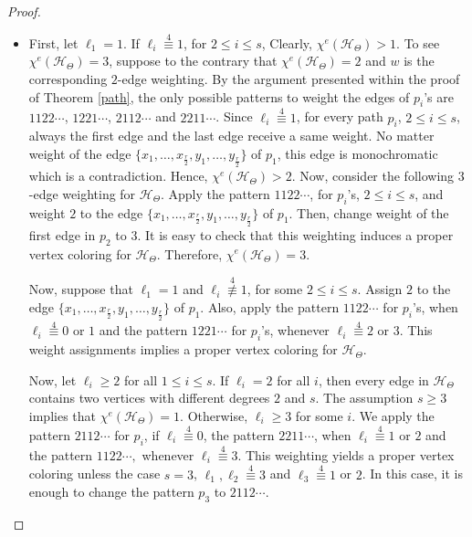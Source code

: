 \documentclass[12pt,a4paper]{article}
\begin{document}
\begin{proof}
\begin{itemize}
		\item[iii.]  First, let $ \ell_1=1 $. If $ \ell_i\overset{4}{\equiv}1 $, for $ 2\leq i\leq s $,
		Clearly, $ \chi^{e}(\mathcal{H}_{\Theta})>1 $. To see $ \chi^{e}(\mathcal{H}_{\Theta})=3 $, suppose to the contrary that $ \chi^{e}(\mathcal{H}_{\Theta})=2 $ and $ w $ is the corresponding $ 2$-edge weighting. By the argument presented within the proof of Theorem \ref{path}, the only possible patterns to weight the edges of $ p_i $'s are $ 1122\cdots $, $ 1221\cdots $, $ 2112\cdots $ and $ 2211\cdots $.
		Since $\ell_i\overset{4}{\equiv}1 $, for every path $ p_i $, $2\leq i \leq s$, always the first edge and the last edge receive a same weight. No matter weight of the edge $ \{x_1,\ldots,x_{\frac{r}{2}}, y_1,\ldots, y_{\frac{r}{2}}\} $ of $p_1$, this edge is monochromatic which is a contradiction. Hence, $ \chi^{e}(\mathcal{H}_{\Theta})>2 $.
		Now, consider the following $ 3$-edge weighting for $ \mathcal{H}_{\Theta} $.  Apply the pattern $ 1122\cdots $, for $p_i$'s, $   2\leq i\leq s $, and weight $2$ to the  edge $ \{x_1,\ldots,x_{\frac{r}{2}}, y_1,\ldots, y_{\frac{r}{2}}\} $ of $ p_1 $. Then, change  weight of the first edge in $ p_2 $ to $ 3 $. It is easy to check that this weighting induces a proper vertex coloring for $ \mathcal{H}_{\Theta} $. Therefore, $ \chi^{e}(\mathcal{H}_{\Theta})=3$.
		
		Now, suppose that $ \ell_1=1 $ and $ \ell_i\overset{4}{\not\equiv}1$, for some $ 2\leq i\leq s $. %
		Assign $2$ to  the edge $ \{x_1,\ldots,x_{\frac{r}{2}}, y_1,\ldots, y_{\frac{r}{2}}\} $ of $ p_1 $. Also, apply the pattern $ 1122\cdots $ for $p_i$'s, when $ \ell_i\overset{4}{\equiv}0$ or $1$ and the pattern $ 1221\cdots $ for $p_i$'s,  whenever $ \ell_i\overset{4}{\equiv}2$ or $3$.  This weight assignments implies a proper vertex coloring for $ \mathcal{H}_{\Theta} $.
		
		Now, let $\ell_i \geq 2$ for all  $1\leq i\leq s$. If  $\ell_i = 2$ for all  $i$, then  every edge in $\mathcal{H}_{\Theta}$ contains two vertices with different degrees $2$ and $s$. The assumption $s \geq 3$ implies that $ \chi^{e}(\mathcal{H}_{\Theta})=1 $. Otherwise,  $ \ell_i \geq 3$ for some  $i$.  We apply the pattern  $ 2112\cdots $ for $p_i$, if $ \ell_i\overset{4}{\equiv}0$, the pattern $ 2211\cdots $, when  $ \ell_i\overset{4}{\equiv}1$ or $2$ and the pattern  $ 1122\cdots ,$  whenever $ \ell_i\overset{4}{\equiv}3$. This weighting yields a proper vertex coloring unless the case $s=3$, $ \ell_1,\ell_2\overset{4}{\equiv}3$ and $ \ell_3\overset{4}{\equiv}1$ or $2$. In this case, it is enough to change the pattern $p_3$ to $2112\cdots$.
	\end{itemize}
	\vspace*{-.5cm}
\end{proof}
\end{document}
